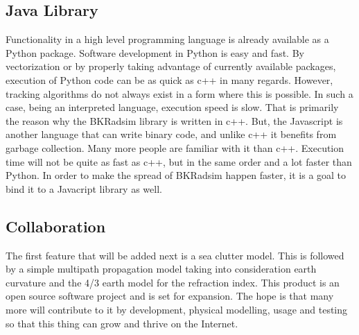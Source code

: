 \documentclass[letterpaper]{book}
\begin{document}
\subsection{Java Library}
Functionality in a high level programming language is already available as a Python package. Software development in Python is easy and fast. By vectorization or by properly taking advantage of currently available packages, execution of Python code can be as quick as c++ in many regards. However, tracking algorithms do not always exist in a form where this is possible. In such a case, being an interpreted language, execution speed is slow. That is primarily the reason why the BKRadsim library is written in c++. But, the Javascript is another language that can write binary code, and unlike c++ it benefits from garbage collection. Many more people are familiar with it than c++. Execution time will not be quite as fast as c++, but in the same order and a lot faster than Python. In order to make the spread of BKRadsim happen faster, it is a goal to bind it to a Javacript library as well.

\subsection{Collaboration}
The first feature that will be added next is a sea clutter model. This is followed by a simple multipath propagation model taking into consideration earth curvature and the 4/3 earth model for the refraction index. This product is an open source software project and is set for expansion. The hope is that many more will contribute to it by development, physical modelling, usage and testing so that this thing can grow and thrive on the Internet. 
\end{document}
